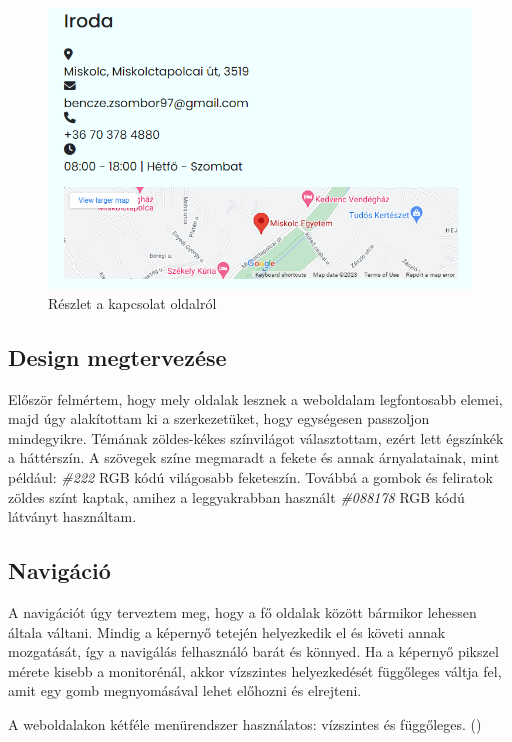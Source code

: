 \begin{figure}[h]
\centering
\includegraphics[scale=0.5]{images/contact.png}
\caption{Részlet a kapcsolat oldalról}
\label{fig:contact}
\end{figure}


\subsection{Design megtervezése}

Először felmértem, hogy mely oldalak lesznek a weboldalam legfontosabb elemei, majd úgy alakítottam ki a szerkezetüket, hogy egységesen passzoljon mindegyikre. Témának zöldes-kékes színvilágot választottam, ezért lett égszínkék a háttérszín. A szövegek színe megmaradt a fekete és annak árnyalatainak, mint például: \emph{\#222} RGB kódú világosabb feketeszín. Továbbá a gombok és feliratok zöldes színt kaptak, amihez a leggyakrabban használt \emph{\#088178} RGB kódú látványt használtam.

\subsection{Navigáció}

A navigációt úgy terveztem meg, hogy a fő oldalak között bármikor lehessen általa váltani. Mindig a képernyő tetején helyezkedik el és követi annak mozgatását, így a navigálás felhasználó barát és könnyed. Ha a képernyő pikszel mérete kisebb a monitorénál, akkor vízszintes helyezkedését függőleges váltja fel, amit egy gomb megnyomásával lehet előhozni és elrejteni.

	A weboldalakon kétféle menürendszer használatos: vízszintes és függőleges. ()

